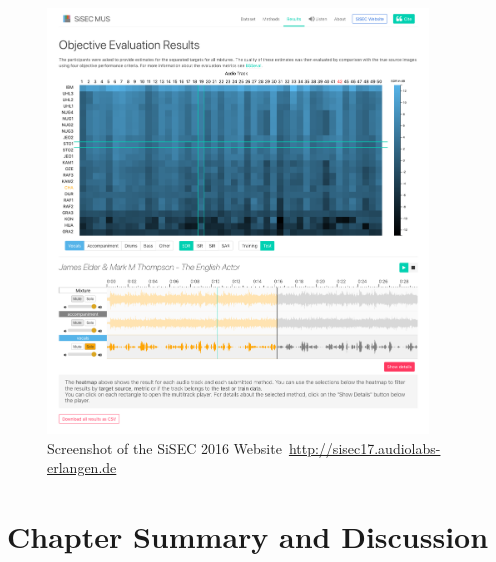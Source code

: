 \begin{figure}[t]
\centering
\includegraphics[width=0.9\textwidth]{Chapters/06_Separation_Unknown/figures/sisec_website.png}
\caption{Screenshot of the SiSEC 2016 Website~\url{http://sisec17.audiolabs-erlangen.de}}
\label{fig:sisec_website}

\end{figure}

\section{Chapter Summary and Discussion}

